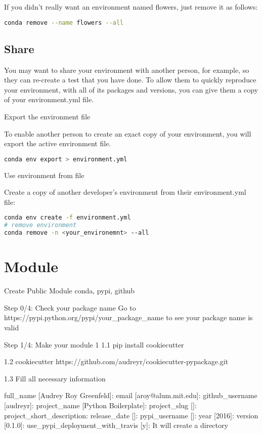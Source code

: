 If you didn't really want an environment named flowers, just remove it as follows:


\begin{lstlisting}[language=bash]
conda remove --name flowers --all
\end{lstlisting}

\subsection{Share}

You may want to share your environment with another person, for example, so they can re-create a test that you have done. To allow them to quickly reproduce your environment, with all of its packages and versions, you can give them a copy of your environment.yml file.

Export the environment file

To enable another person to create an exact copy of your environment, you will export the active environment file.

\begin{lstlisting}[language=bash]
conda env export > environment.yml
\end{lstlisting}

Use environment from file

Create a copy of another developer's environment from their environment.yml file:

\begin{lstlisting}[language=bash]
conda env create -f environment.yml
# remove environment
conda remove -n <your_environemnt> --all
\end{lstlisting}



\section{Module}


Create Public Module
conda, pypi, github

Step 0/4: Check your package name
Go to https://pypi.python.org/pypi/your_package_name to see your package name is valid

Step 1/4: Make your module 1
1.1 pip install cookiecutter

1.2 cookiecutter https://github.com/audreyr/cookiecutter-pypackage.git

1.3 Fill all necessary information

full_name [Audrey Roy Greenfeld]:
email [aroy@alum.mit.edu]:
github_username [audreyr]:
project_name [Python Boilerplate]:
project_slug []:
project_short_description:
release_date []:
pypi_username []:
year [2016]:
version [0.1.0]:
use_pypi_deployment_with_travis [y]:
It will create a directory

